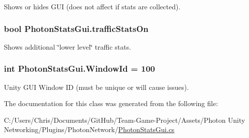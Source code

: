 Shows or hides G\+UI (does not affect if stats are collected).

\subsubsection[{\texorpdfstring{traffic\+Stats\+On}{trafficStatsOn}}]{\setlength{\rightskip}{0pt plus 5cm}bool Photon\+Stats\+Gui.\+traffic\+Stats\+On}\hypertarget{class_photon_stats_gui_ac8015189e49ffdb616367c7d9f9e91db}{}\label{class_photon_stats_gui_ac8015189e49ffdb616367c7d9f9e91db}


Shows additional \char`\"{}lower level\char`\"{} traffic stats.

\subsubsection[{\texorpdfstring{Window\+Id}{WindowId}}]{\setlength{\rightskip}{0pt plus 5cm}int Photon\+Stats\+Gui.\+Window\+Id = 100}\hypertarget{class_photon_stats_gui_a9e96e77b74435c5ff2eeccf2d409685f}{}\label{class_photon_stats_gui_a9e96e77b74435c5ff2eeccf2d409685f}


Unity G\+UI Window ID (must be unique or will cause issues).



The documentation for this class was generated from the following file\+:\begin{DoxyCompactItemize}
\item 
C\+:/\+Users/\+Chris/\+Documents/\+Git\+Hub/\+Team-\/\+Game-\/\+Project/\+Assets/\+Photon Unity Networking/\+Plugins/\+Photon\+Network/\hyperlink{_photon_stats_gui_8cs}{Photon\+Stats\+Gui.\+cs}\end{DoxyCompactItemize}
